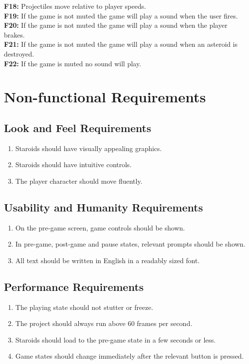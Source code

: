 \documentclass[12pt, titlepage]{article}
\begin{document}
\begin{enumerate}
    \textbf{F18:} Projectiles move relative to player speeds.\\
    \textbf{F19:} If the game is not muted the game will play a sound when the user fires.\\
    \textbf{F20:} If the game is not muted the game will play a sound when the player brakes.\\
    \textbf{F21:} If the game is not muted the game will play a sound when an asteroid is destroyed.\\
    \textbf{F22:} If the game is muted no sound will play.\\
  \end{enumerate}

\section{Non-functional Requirements}

\subsection{Look and Feel Requirements}
  \begin{enumerate}
    \item Staroids should have visually appealing graphics.
    \item Staroids should have intuitive controls.
    \item The player character should move fluently.
  \end{enumerate}

\subsection{Usability and Humanity Requirements}
  \begin{enumerate}
    \item On the pre-game screen, game controls should be shown.
    \item In pre-game, post-game and pause states, relevant prompts should be shown.
    \item All text should be written in English in a readably sized font.
  \end{enumerate}

\subsection{Performance Requirements}
  \begin{enumerate}
    \item The playing state should not stutter or freeze.
    \item The project should always run above 60 frames per second.
    \item Staroids should load to the pre-game state in a few seconds or less.
    \item Game states should change immediately after the relevant button is pressed.
  \end{enumerate}
\end{document}
